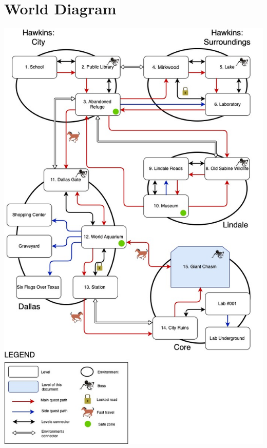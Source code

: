\section{World Diagram}

\vspace*{1cm}
\begin{center}
	\includegraphics[width=0.8\linewidth]{images/graphs/world_diagram.jpg}
\end{center}